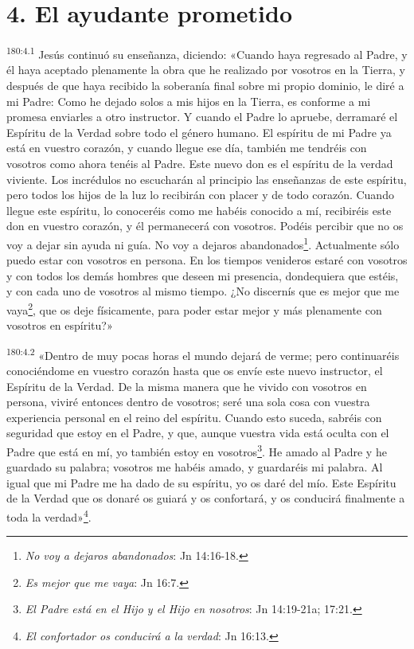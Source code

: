 \section*{4. El ayudante prometido}
\par 
\textsuperscript{180:4.1} Jesús continuó su enseñanza, diciendo: «Cuando haya regresado al Padre, y él haya aceptado plenamente la obra que he realizado por vosotros en la Tierra, y después de que haya recibido la soberanía final sobre mi propio dominio, le diré a mi Padre: Como he dejado solos a mis hijos en la Tierra, es conforme a mi promesa enviarles a otro instructor. Y cuando el Padre lo apruebe, derramaré el Espíritu de la Verdad sobre todo el género humano. El espíritu de mi Padre ya está en vuestro corazón, y cuando llegue ese día, también me tendréis con vosotros como ahora tenéis al Padre. Este nuevo don es el espíritu de la verdad viviente. Los incrédulos no escucharán al principio las enseñanzas de este espíritu, pero todos los hijos de la luz lo recibirán con placer y de todo corazón. Cuando llegue este espíritu, lo conoceréis como me habéis conocido a mí, recibiréis este don en vuestro corazón, y él permanecerá con vosotros. Podéis percibir que no os voy a dejar sin ayuda ni guía. No voy a dejaros abandonados\footnote{\textit{No voy a dejaros abandonados}: Jn 14:16-18.}. Actualmente sólo puedo estar con vosotros en persona. En los tiempos venideros estaré con vosotros y con todos los demás hombres que deseen mi presencia, dondequiera que estéis, y con cada uno de vosotros al mismo tiempo. ¿No discernís que es mejor que me vaya\footnote{\textit{Es mejor que me vaya}: Jn 16:7.}, que os deje físicamente, para poder estar mejor y más plenamente con vosotros en espíritu?»

\par 
\textsuperscript{180:4.2} «Dentro de muy pocas horas el mundo dejará de verme; pero continuaréis conociéndome en vuestro corazón hasta que os envíe este nuevo instructor, el Espíritu de la Verdad. De la misma manera que he vivido con vosotros en persona, viviré entonces dentro de vosotros; seré una sola cosa con vuestra experiencia personal en el reino del espíritu. Cuando esto suceda, sabréis con seguridad que estoy en el Padre, y que, aunque vuestra vida está oculta con el Padre que está en mí, yo también estoy en vosotros\footnote{\textit{El Padre está en el Hijo y el Hijo en nosotros}: Jn 14:19-21a; 17:21.}. He amado al Padre y he guardado su palabra; vosotros me habéis amado, y guardaréis mi palabra. Al igual que mi Padre me ha dado de su espíritu, yo os daré del mío. Este Espíritu de la Verdad que os donaré os guiará y os confortará, y os conducirá finalmente a toda la verdad»\footnote{\textit{El confortador os conducirá a la verdad}: Jn 16:13.}.

